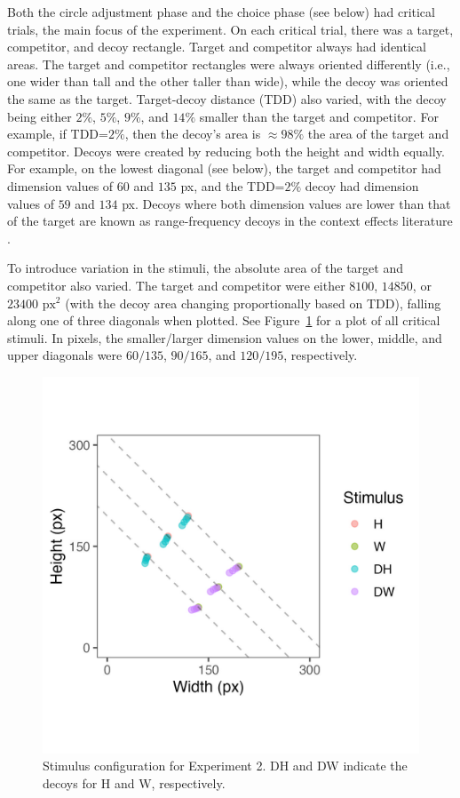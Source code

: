 Both the circle adjustment phase and the choice phase (see below) had critical trials, the main focus of the experiment. On each critical trial, there was a target, competitor, and decoy rectangle. Target and competitor always had identical areas. The target and competitor rectangles were always oriented differently (i.e., one wider than tall and the other taller than wide), while the decoy was oriented the same as the target. Target-decoy distance (TDD) also varied, with the decoy being either $2\%$, $5\%$, $9\%$, and $14\%$ smaller than the target and competitor. For example, if TDD=$2\%$, then the decoy's area is $\approx98\%$ the area of the target and competitor. Decoys were created by reducing both the height and width equally. For example, on the lowest diagonal (see below), the target and competitor had dimension values of $60$ and $135$ px, and the TDD=$2\%$ decoy had dimension values of $59$ and $134$ px. Decoys where both dimension values are lower than that of the target are known as range-frequency decoys in the context effects literature \parencite{wedellDistinguishingModelsContextuallya}. 

To introduce variation in the stimuli, the absolute area of the target and competitor also varied. The target and competitor were either $8100$, $14850$, or $23400$ $\text{px}^2$ (with the decoy area changing proportionally based on TDD), falling along one of three diagonals when plotted. See Figure~\ref{fig:e2_stim} for a plot of all critical stimuli. In pixels, the smaller/larger dimension values on the lower, middle, and upper diagonals were $60/135$, $90/165$, and $120/195$, respectively.
 
\begin{figure}
   \centering
   \includegraphics[width=\linewidth]{figures/circle_exp_stim_plot.jpeg}
   \caption{Stimulus configuration for Experiment 2. DH and DW indicate the decoys for H and W, respectively.}
   \label{fig:e2_stim}
\end{figure}


